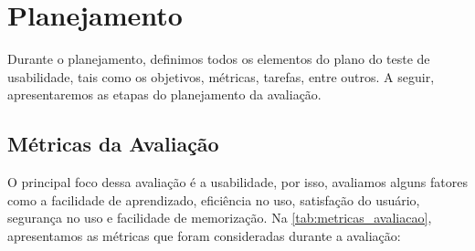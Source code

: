 \begin{figure}[H]
    \centering
\end{figure}

\section{Planejamento}

Durante o planejamento, definimos todos os elementos do plano do teste de usabilidade, tais como os objetivos, métricas, tarefas, entre outros. A seguir, apresentaremos as etapas do planejamento da avaliação.

\subsection{Métricas da Avaliação}

O principal foco dessa avaliação é a usabilidade, por isso, avaliamos alguns fatores
como a facilidade de aprendizado, eficiência no uso, satisfação do usuário, segurança no uso e facilidade de memorização. Na \autoref{tab:metricas_avaliacao}, apresentamos as métricas que foram consideradas durante a avaliação:

